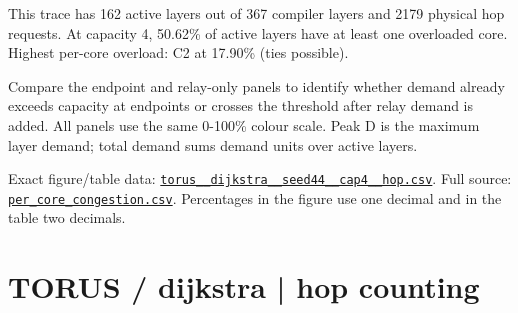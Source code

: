 \documentclass[10pt,a4paper]{article}
\begin{document}
This trace has 162 active layers out of 367 compiler layers and 2179 physical hop requests. At capacity 4, 50.62\% of active layers have at least one overloaded core. Highest per-core overload: C2 at 17.90\% (ties possible).\par
Compare the endpoint and relay-only panels to identify whether demand already exceeds capacity at endpoints or crosses the threshold after relay demand is added. All panels use the same 0-100\% colour scale. Peak D is the maximum layer demand; total demand sums demand units over active layers.\par
Exact figure/table data: \href{\detokenize{file:///home/dhruv-pansuriya/Documents/BTP/Compiler-Driven-ACE/output/pdf/qaoa_methods_congestion/tables/torus__dijkstra__seed44__cap4__hop.csv}}{\nolinkurl{torus__dijkstra__seed44__cap4__hop.csv}}. Full source: \href{\detokenize{file:///home/dhruv-pansuriya/Documents/BTP/Compiler-Driven-ACE/results/qaoa_2seed_2026-10-26/congestion/per_core_congestion.csv}}{\nolinkurl{per_core_congestion.csv}}. Percentages in the figure use one decimal and in the table two decimals.\par
\clearpage
\section*{TORUS / dijkstra | hop counting}
\end{document}
